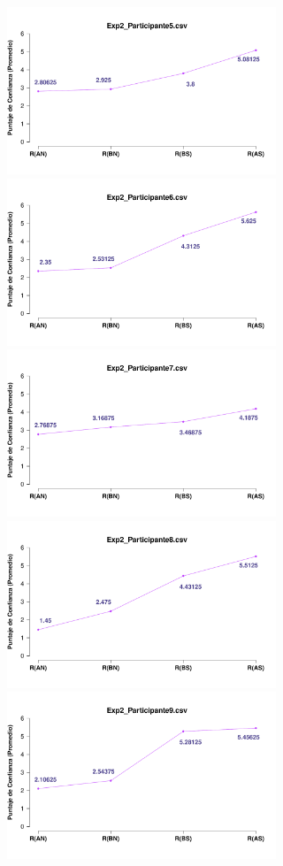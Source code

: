 \documentclass[a4paper ]{article}
\begin{document}
\begin{figure}[th]
\includegraphics[width=9cm, height=5cm]{Figures/MirrorRating_Exp2_P5} \includegraphics[width=9cm, height=5cm]{Figures/MirrorRating_Exp2_P6}
\includegraphics[width=9cm, height=5cm]{Figures/MirrorRating_Exp2_P7} \includegraphics[width=9cm, height=5cm]{Figures/MirrorRating_Exp2_P8} 
\includegraphics[width=9cm, height=5cm]{Figures/MirrorRating_Exp2_P9}
\end{figure}
\end{document}
